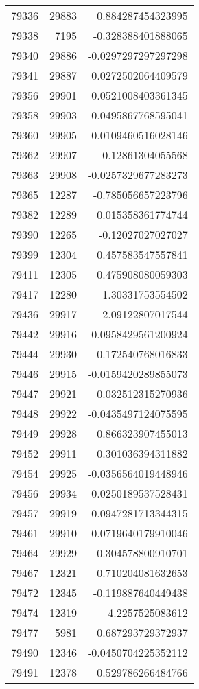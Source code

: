 \begin{tabular}{r | r | r}
79336 & 29883 & 0.884287454323995 \\
79338 & 7195 & -0.328388401888065 \\
79340 & 29886 & -0.0297297297297298 \\
79341 & 29887 & 0.0272502064409579 \\
79356 & 29901 & -0.0521008403361345 \\
79358 & 29903 & -0.0495867768595041 \\
79360 & 29905 & -0.0109460516028146 \\
79362 & 29907 & 0.12861304055568 \\
79363 & 29908 & -0.0257329677283273 \\
79365 & 12287 & -0.785056657223796 \\
79382 & 12289 & 0.015358361774744 \\
79390 & 12265 & -0.12027027027027 \\
79399 & 12304 & 0.457583547557841 \\
79411 & 12305 & 0.475908080059303 \\
79417 & 12280 & 1.30331753554502 \\
79436 & 29917 & -2.09122807017544 \\
79442 & 29916 & -0.0958429561200924 \\
79444 & 29930 & 0.172540768016833 \\
79446 & 29915 & -0.0159420289855073 \\
79447 & 29921 & 0.032512315270936 \\
79448 & 29922 & -0.0435497124075595 \\
79449 & 29928 & 0.866323907455013 \\
79452 & 29911 & 0.301036394311882 \\
79454 & 29925 & -0.0356564019448946 \\
79456 & 29934 & -0.0250189537528431 \\
79457 & 29919 & 0.0947281713344315 \\
79461 & 29910 & 0.0719640179910046 \\
79464 & 29929 & 0.304578800910701 \\
79467 & 12321 & 0.710204081632653 \\
79472 & 12345 & -0.119887640449438 \\
79474 & 12319 & 4.2257525083612 \\
79477 & 5981 & 0.687293729372937 \\
79490 & 12346 & -0.0450704225352112 \\
79491 & 12378 & 0.529786266484766 \\

\end{tabular}

